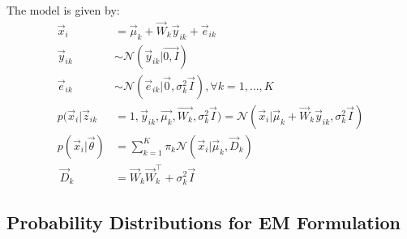 \documentclass[12pt,twoside]{article}
\begin{document}
The model is given by:
\begin{align*}
	\vec{x}_i &= \vec{\mu}_k + \vec{W}_k\vec{y}_{ik} + \vec{e}_{ik}\\
	\vec{y}_{ik} &\sim \mathcal{N} (\vec{y}_{ik}\vert \vec{0,I})\\
	\vec{e}_{ik} & \sim \mathcal{N} (\vec{e}_{ik}\vert \vec{0},\sigma^2_k\vec{I}), \forall k = 1,\dots, K\\
	p(\vec{x}_i\vert  \vec{z}_{ik} &=1, \vec{y}_{ik}, \vec{\mu_k}, \vec{W_k}, \sigma^2_k \vec{I}) = \mathcal{N}(\vec{x}_i \vert \vec{\mu}_k + \vec{W}_k\vec{y}_{ik}, \sigma_k^2\vec{I})\\
	p(\vec{x}_i\vert \vec{\theta})& = \sum_{k=1}^K \pi_k \mathcal{N}(\vec{x}_i \vert \vec{\mu}_k, \vec{D}_k)\\\
	\vec{D}_k &= \vec{W}_k\vec{W}_k^\top + \sigma_k^2\vec{I}
\end{align*}


\subsection{Probability Distributions for EM Formulation}
\end{document}
